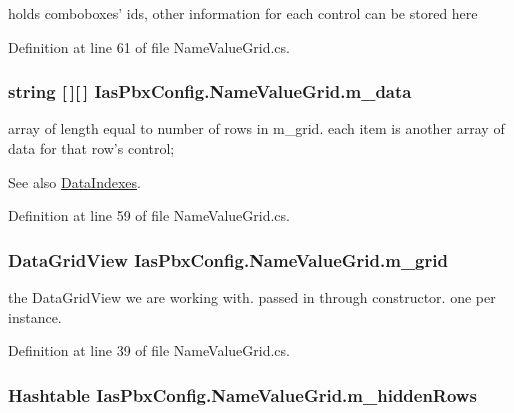 holds comboboxes' ids, other information for each control can be stored here 

Definition at line 61 of file NameValueGrid.cs.\hypertarget{class_ias_pbx_config_1_1_name_value_grid_a816a0c9ece3edb83afb39863e1f843b4}{
\subsubsection[{m\_\-data}]{\setlength{\rightskip}{0pt plus 5cm}string \mbox{[}$\,$\mbox{]}\mbox{[}$\,$\mbox{]} {\bf IasPbxConfig.NameValueGrid.m\_\-data}}}
\label{class_ias_pbx_config_1_1_name_value_grid_a816a0c9ece3edb83afb39863e1f843b4}


array of length equal to number of rows in m\_\-grid. each item is another array of data for that row's control; \begin{DoxySeeAlso}{See also}
\hyperlink{class_ias_pbx_config_1_1_name_value_grid_ad252779c8bb45743ebf71025b284957e}{DataIndexes}. 
\end{DoxySeeAlso}


Definition at line 59 of file NameValueGrid.cs.\hypertarget{class_ias_pbx_config_1_1_name_value_grid_a588270d544b904d41de5081329739d3d}{
\subsubsection[{m\_\-grid}]{\setlength{\rightskip}{0pt plus 5cm}DataGridView {\bf IasPbxConfig.NameValueGrid.m\_\-grid}}}
\label{class_ias_pbx_config_1_1_name_value_grid_a588270d544b904d41de5081329739d3d}


the DataGridView we are working with. passed in through constructor. one per instance. 

Definition at line 39 of file NameValueGrid.cs.\hypertarget{class_ias_pbx_config_1_1_name_value_grid_aba9a53f0a732686cb3ba46dce7171a75}{
\subsubsection[{m\_\-hiddenRows}]{\setlength{\rightskip}{0pt plus 5cm}Hashtable {\bf IasPbxConfig.NameValueGrid.m\_\-hiddenRows}}}
\label{class_ias_pbx_config_1_1_name_value_grid_aba9a53f0a732686cb3ba46dce7171a75}


